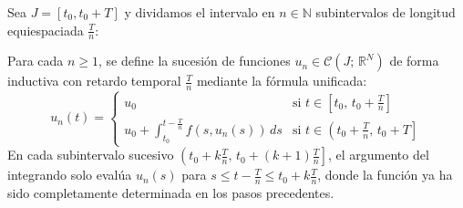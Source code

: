 
\begin{proposición}
    Sea $J = [t_0, t_0 + T]$ y dividamos el intervalo en $n \in \mathbb{N}$ subintervalos de longitud equiespaciada $\frac{T}{n}$:

    \begin{center}
    \end{center}

    Para cada $n \ge 1$, se define la sucesión de funciones $u_n \in \mathcal{C}(J; \, \mathbb{R}^N)$ de forma inductiva con retardo temporal $\frac{T}{n}$ mediante la fórmula unificada:
    \[
        u_n(t) =
        \begin{cases}
            u_0 & \text{si } t \in \left[ t_0, \, t_0 + \frac{T}{n} \right] \\
            u_0 + \int_{t_0}^{t - \frac{T}{n}} f(s, u_n(s)) \, ds & \text{si } t \in \left( t_0 + \frac{T}{n}, \, t_0 + T \right]
        \end{cases}
    \]
    En cada subintervalo sucesivo $\left( t_0 + k\frac{T}{n}, \, t_0 + (k+1)\frac{T}{n} \right]$, el argumento del integrando solo evalúa $u_n(s)$ para $s \leq t - \frac{T}{n} \leq t_0 + k\frac{T}{n}$, donde la función ya ha sido completamente determinada en los pasos precedentes.
\end{proposición}

